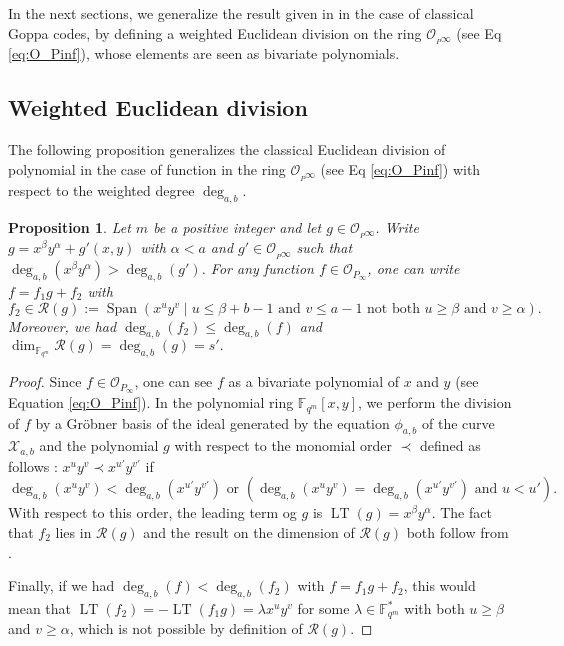 \documentclass[a4paper]{article}
\newtheorem{proposition}[thm]{Proposition}
\theoremstyle{definition}
\theoremstyle{remark}
\newcommand{\calO}{\mathcal{O}}
\newcommand{\calR}{\mathcal{R}}
\newcommand{\calX}{\mathcal{X}}
\newcommand{\fqm}{\mathbb{F}_{q^m}}
\newcommand{\F}{\mathbb{F}}
\newcommand{\Span}[1]{\operatorname{Span}\left(#1\right)}
\newcommand{\LT}[1]{\operatorname{LT}\left(#1\right)}
\newcommand{\degab}[1]{\deg_{a,b}\left(#1\right)}
\begin{document}
\noindent In the next sections, we generalize the result given in \cite{MT21} in the case of classical Goppa codes, by defining a weighted Euclidean division on the ring $\calO_{_P\infty}$ (see Eq \eqref{eq:O_Pinf}), whose elements are seen as bivariate polynomials. 
\subsection{Weighted Euclidean division}
\noindent The following proposition generalizes the classical Euclidean division of polynomial in the case of function in the ring $\calO_{_P\infty}$ (see Eq \eqref{eq:O_Pinf}) with respect to the weighted degree $\deg_{a,b}$.

\begin{proposition}\label{prop:div_grob}
Let $m$ be a positive integer and let $g \in \calO_{_P\infty}$. Write $g=x^\beta y^\alpha +g'(x,y)$ with $\alpha < a$ and $g' \in \calO_{_P\infty}$ such that $\degab{x^\beta y^\alpha}>\degab{g'}$.
For any function $f \in \calO_{P_\infty}$, one can write $f=f_1g+f_2$ with 
\[f_2 \in \calR(g):= \Span{x^u y^v \mid u \leq \beta + b-1 \text{ and } v\leq a-1 \text{ not both }  u \geq \beta \text{ and } v \geq \alpha}.\]
Moreover, we had $\degab{f_2} \leq \degab{f}$ and $\dim_{\fqm} \calR(g) = \degab{g}=s'.$ 
\end{proposition}
\begin{proof}
  Since $f \in \calO_{P_\infty}$, one can see $f$ as a bivariate polynomial of $x$ and $y$ (see Equation \ref{eq:O_Pinf}). In the polynomial ring $\F_{q^m}[x,y]$, we perform the division of $f$ by a Gr\"obner basis of the ideal generated by the equation $\phi_{a,b}$ of the curve $\calX_{a,b}$ and the polynomial $g$ with respect to the monomial order $\prec$ defined as follows : $x^uy^v \prec x^{u'}y^{v'}$ if
 \[ \degab{x^uy^v} < \degab{x^{u'}y^{v'}} \text{ or } \left(\degab{x^uy^v} = \degab{x^{u'}y^{v'}}  \text{ and } u < u'\right).\]
 With respect to this order, the leading term og $g$ is $\LT{g}=x^\beta y^\alpha$. The fact that $f_2$ lies in $\calR(g)$ and the result on the dimension of $\calR(g)$ both follow from \cite[Proposition 4]{GH00}.
 
 Finally, if we had $\degab{f} < \degab{f_2}$ with $f=f_1 g +f_2$, this would mean that $\LT{f_2}=-\LT{f_1 g}=\lambda x^uy^v$ for some $\lambda \in \F_{q^m}^*$ with both $u \geq \beta$ and $v \geq \alpha$, which is not possible by definition of $\calR\left(g\right)$.
\end{proof}
\end{document}
